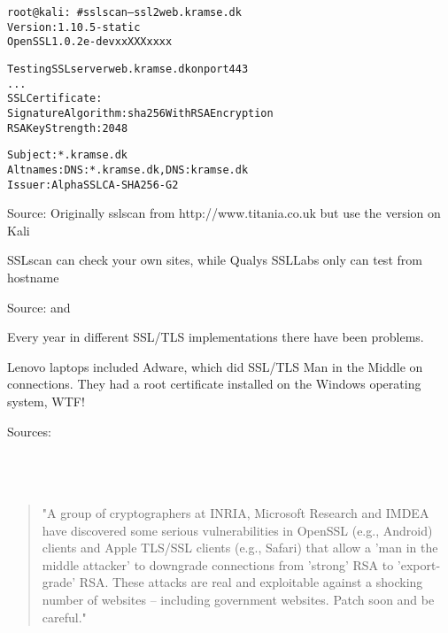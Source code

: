\documentclass[Screen16to9,17pt]{foils}
\begin{document}

\begin{alltt}\small
root@kali:~# sslscan --ssl2 web.kramse.dk
Version: 1.10.5-static
OpenSSL 1.0.2e-dev xx XXX xxxx

Testing SSL server web.kramse.dk on port 443
...
  SSL Certificate:
Signature Algorithm: sha256WithRSAEncryption
RSA Key Strength:    2048

Subject:  *.kramse.dk
Altnames: DNS:*.kramse.dk, DNS:kramse.dk
Issuer:   AlphaSSL CA - SHA256 - G2
\end{alltt}

Source:
Originally sslscan from http://www.titania.co.uk
 but use the version on Kali

SSLscan can check your own sites, while Qualys SSLLabs only can test from hostname










Source:  and \\

Every year in different SSL/TLS implementations there have been problems.



Lenovo laptops included Adware, which did SSL/TLS Man in the Middle on connections.
They had a root certificate installed on the Windows operating system, WTF!

{\footnotesize Sources:\\
\\
\\
\\
}{\tiny{}
}




\begin{quote}\small
"A group of cryptographers at INRIA, Microsoft Research and IMDEA have discovered some serious vulnerabilities in OpenSSL (e.g., Android) clients and Apple TLS/SSL clients (e.g., Safari) that allow a 'man in the middle attacker' to downgrade connections from 'strong' RSA to 'export-grade' RSA. These attacks are real and exploitable against a shocking number of websites -- including government websites. Patch soon and be careful."
\end{quote}
\end{document}
